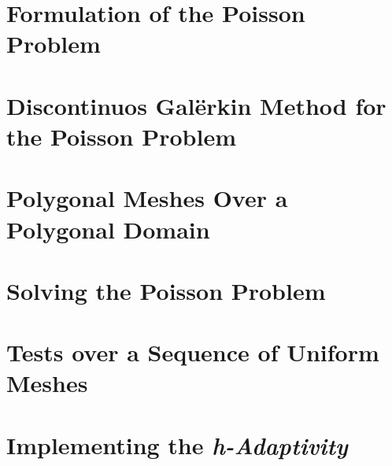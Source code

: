 \documentclass[12pt, twoside]{article}
\title{\reporttitle}
\author{Andrea Di Antonio, 10655477} %
\date{Exam session of July, 2024 \\ Academic Year 2023-24}
\begin{document}
	\maketitle
	\thispagestyle{fancy}

	\begin{abstract}
		\begin{center}
			Report for the course \textit{Advanced Programming for Scientific Computing} on the implementation details of an adaptive HP discontinuous Galërkin algorithm.
		\end{center}
	\end{abstract}

	\newpage
	\tableofcontents

	\newpage
    \section{Formulation of the Poisson Problem}
	

	\newpage
    \section{Discontinuos Galërkin Method for the Poisson Problem}
	

	\newpage
    \section{Polygonal Meshes Over a Polygonal Domain}
	

	\newpage
    \section{Solving the Poisson Problem}

	\newpage
    \section{Tests over a Sequence of Uniform Meshes}

	\newpage
    \section{Implementing the \textit{h-Adaptivity}}

	\newpage
	
	
\end{document}
